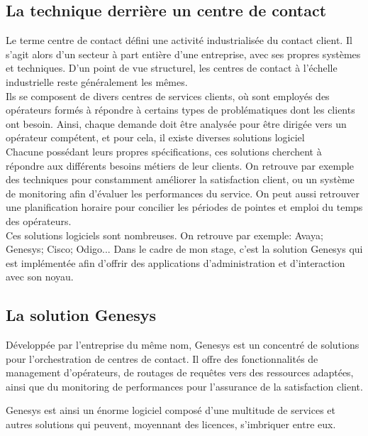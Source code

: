 \documentclass{rapport}
\begin{document}
\subsection{La technique derrière un centre de contact}

Le terme centre de contact défini une activité industrialisée du contact client. Il s'agit alors d'un secteur à part entière d'une entreprise, avec ses propres systèmes et techniques.
D'un point de vue structurel, les centres de contact à l'échelle industrielle reste généralement les mêmes.\\

Ils se composent de divers centres de services clients, où sont employés des opérateurs formés à répondre à certains types de problématiques dont les clients ont besoin. Ainsi, chaque demande doit être analysée pour être dirigée vers un opérateur compétent, et pour cela, il existe diverses solutions logiciel\\

Chacune possédant leurs propres spécifications, ces solutions cherchent à répondre aux différents besoins métiers de leur clients.
On retrouve par exemple des techniques pour constamment améliorer la satisfaction client, ou un système de monitoring afin d'évaluer les performances du service. On peut aussi retrouver une planification horaire pour concilier les périodes de pointes et emploi du temps des opérateurs.\\

Ces solutions logiciels sont nombreuses. On retrouve par exemple:
Avaya; Genesys; Cisco; Odigo...
Dans le cadre de mon stage, c'est la solution Genesys qui est implémentée afin d'offrir des applications d'administration et d'interaction avec son noyau.

\subsection{La solution Genesys}

Développée par l'entreprise du même nom, Genesys est un concentré de solutions pour l'orchestration de centres de contact. Il offre des fonctionnalités de management d'opérateurs, de routages de requêtes vers des ressources adaptées, ainsi que du monitoring de performances pour l'assurance de la satisfaction client.\\


Genesys est ainsi un énorme logiciel composé d'une multitude de services et autres solutions qui peuvent, moyennant des licences, s'imbriquer entre eux.\\
\end{document}

